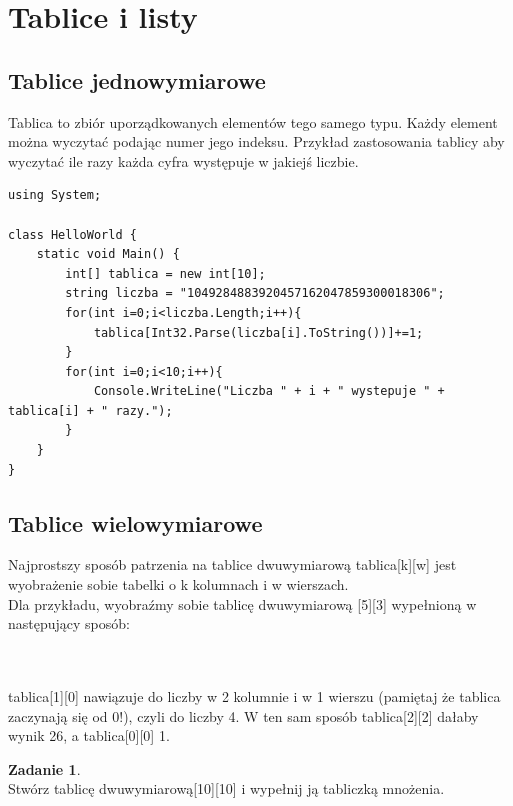 \documentclass[a4paper]{article}
\theoremstyle{definition}
\newtheorem{zadanie}[theorem]{Zadanie}
\begin{document}
\section{Tablice i listy}
\subsection{Tablice jednowymiarowe}
Tablica to zbiór uporządkowanych elementów tego samego typu. Każdy element można wyczytać podając numer jego indeksu. Przykład zastosowania tablicy aby wyczytać ile razy każda cyfra występuje w jakiejś liczbie.\\
\begin{lstlisting}[frame=single]
using System;

class HelloWorld {
    static void Main() {
    	int[] tablica = new int[10];
        string liczba = "1049284883920457162047859300018306";
        for(int i=0;i<liczba.Length;i++){
        	tablica[Int32.Parse(liczba[i].ToString())]+=1;
        }
        for(int i=0;i<10;i++){
        	Console.WriteLine("Liczba " + i + " wystepuje " + tablica[i] + " razy.");
        }
    }
}

\end{lstlisting}
\subsection{Tablice wielowymiarowe}
Najprostszy sposób patrzenia na tablice dwuwymiarową tablica[k][w] jest wyobrażenie sobie tabelki o k kolumnach i w wierszach.\\
Dla przykładu, wyobraźmy sobie tablicę dwuwymiarową [5][3] wypełnioną w następujący sposób:
\\\\
\\
tablica[1][0] nawiązuje do liczby w 2 kolumnie i w 1 wierszu (pamiętaj że tablica zaczynają się od 0!), czyli do liczby 4. W ten sam sposób tablica[2][2] dałaby wynik 26, a tablica[0][0] 1.
\begin{zadanie}
\\Stwórz tablicę dwuwymiarową[10][10] i wypełnij ją tabliczką mnożenia.
\end{zadanie}
\end{document}
